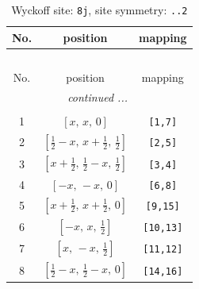 \documentclass[fleqn,8pt]{jsarticle}
\begin{document}
\begin{longtable}{ccc}
\caption{Wyckoff site: {\tt 8j}, site symmetry: {\tt ..2}}
 \\
 \hline \hline
No. & position & mapping \\ \hline \endfirsthead

\multicolumn{2}{l}{\tablename\ \thetable{}} \\
 \hline \hline
No. & position & mapping \\ \hline \endhead

 \hline \hline
\multicolumn{2}{r}{\footnotesize\it continued ...} \\ \endfoot

 \hline \hline
\multicolumn{2}{r}{} \\ \endlastfoot

1 & $\left[ x,\, x,\, 0 \right]$ & {\tt [1,7]} \\ \hline
2 & $\left[ \frac{1}{2} - x,\, x + \frac{1}{2},\, \frac{1}{2} \right]$ & {\tt [2,5]} \\ \hline
3 & $\left[ x + \frac{1}{2},\, \frac{1}{2} - x,\, \frac{1}{2} \right]$ & {\tt [3,4]} \\ \hline
4 & $\left[ - x,\, - x,\, 0 \right]$ & {\tt [6,8]} \\ \hline
5 & $\left[ x + \frac{1}{2},\, x + \frac{1}{2},\, 0 \right]$ & {\tt [9,15]} \\ \hline
6 & $\left[ - x,\, x,\, \frac{1}{2} \right]$ & {\tt [10,13]} \\ \hline
7 & $\left[ x,\, - x,\, \frac{1}{2} \right]$ & {\tt [11,12]} \\ \hline
8 & $\left[ \frac{1}{2} - x,\, \frac{1}{2} - x,\, 0 \right]$ & {\tt [14,16]} \\
\end{longtable}
\renewcommand{\arraystretch}{1.2}
\end{document}
